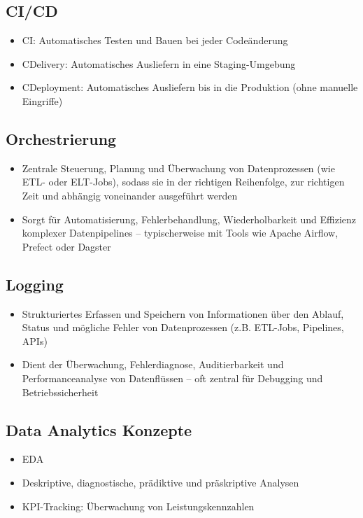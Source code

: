 \documentclass[11pt]{scrartcl}
\begin{document}
\subsection{CI/CD}
\begin{itemize}
	\item CI: Automatisches Testen und Bauen bei jeder Codeänderung
	\item CDelivery: Automatisches Ausliefern in eine Staging-Umgebung
	\item CDeployment: Automatisches Ausliefern bis in die Produktion (ohne manuelle Eingriffe)	
\end{itemize}


\subsection{Orchestrierung}
\begin{itemize}
\item Zentrale Steuerung, Planung und Überwachung von Datenprozessen (wie ETL- oder ELT-Jobs), sodass sie in der richtigen Reihenfolge, zur richtigen Zeit und abhängig voneinander ausgeführt werden
\item Sorgt für Automatisierung, Fehlerbehandlung, Wiederholbarkeit und Effizienz komplexer Datenpipelines – typischerweise mit Tools wie Apache Airflow, Prefect oder Dagster
\end{itemize}


\subsection{Logging}
\begin{itemize}
\item Strukturiertes Erfassen und Speichern von Informationen über den Ablauf, Status und mögliche Fehler von Datenprozessen (z.B. ETL-Jobs, Pipelines, APIs)
\item Dient der Überwachung, Fehlerdiagnose, Auditierbarkeit und Performanceanalyse von Datenflüssen – oft zentral für Debugging und Betriebssicherheit
\end{itemize}


\subsection{Data Analytics Konzepte}
\begin{itemize}
	\item EDA
	\item Deskriptive, diagnostische, prädiktive und präskriptive Analysen
	\item KPI-Tracking: Überwachung von Leistungskennzahlen
\end{itemize}
\end{document}
